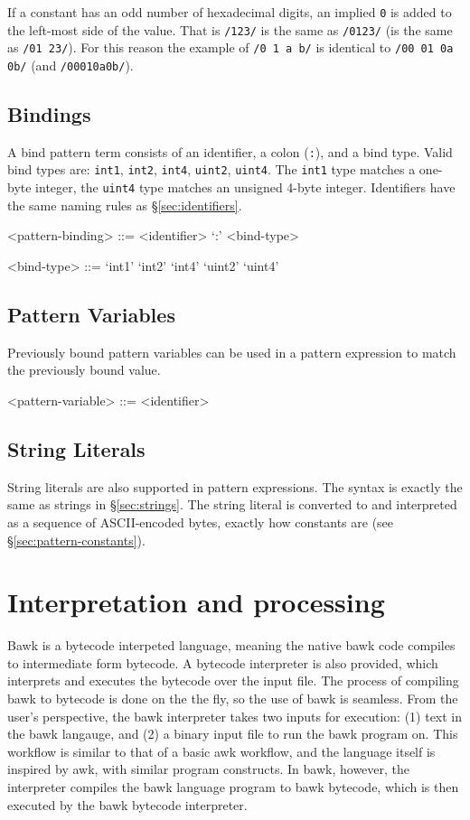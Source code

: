 \documentclass[letterpaper]{article}
\begin{document}
If a constant has an odd number of hexadecimal digits, an implied \texttt{0} is added to the left-most side of the value.  That is \texttt{/123/} is the same as \texttt{/0123/} (is the same as \texttt{/01 23/}).  For this reason the example of \texttt{/0 1 a b/} is identical to \texttt{/00 01 0a 0b/} (and \texttt{/00010a0b/}).
 
\subsection{Bindings}
\label{sec:pattern-bindings}
A bind pattern term consists of an identifier, a colon (\texttt{:}), and a bind type.  Valid bind types are: \texttt{int1}, \texttt{int2}, \texttt{int4}, \texttt{uint2}, \texttt{uint4}.  The \texttt{int1} type matches a one-byte integer, the \texttt{uint4} type matches an unsigned 4-byte integer.  Identifiers have the same naming rules as \S\ref{sec:identifiers}.
\begin{grammar}
<pattern-binding> ::= <identifier> `:' <bind-type>

<bind-type> ::= `int1'
\alt `int2'
\alt `int4'
\alt `uint2'
\alt `uint4'
\end{grammar}

\subsection{Pattern Variables}
Previously bound pattern variables can be used in a pattern expression to match the previously bound value.
\begin{grammar}
<pattern-variable> ::= <identifier>
\end{grammar}

\subsection{String Literals}
String literals are also supported in pattern expressions.  The syntax is exactly the same as strings in \S\ref{sec:strings}.  The string literal is converted to and interpreted as a sequence of ASCII-encoded bytes, exactly how constants are (see \S\ref{sec:pattern-constants}).  

\section{Interpretation and processing}
\label{sec:interpretation}
Bawk is a bytecode interpeted language, meaning the native bawk code compiles to intermediate form bytecode.  A bytecode interpreter is also provided, which interprets and executes the bytecode over the input file.  The process of compiling bawk to bytecode is done on the the fly, so the use of bawk is seamless.  From the user's perspective, the bawk interpreter takes two inputs for execution: (1) text in the bawk langauge, and (2) a binary input file to run the bawk program on.  This workflow is similar to that of a basic awk workflow, and the language itself is inspired by awk, with similar program constructs.  In bawk, however, the interpreter compiles the bawk language program to bawk bytecode, which is then executed by the bawk bytecode interpreter.
\end{document}
